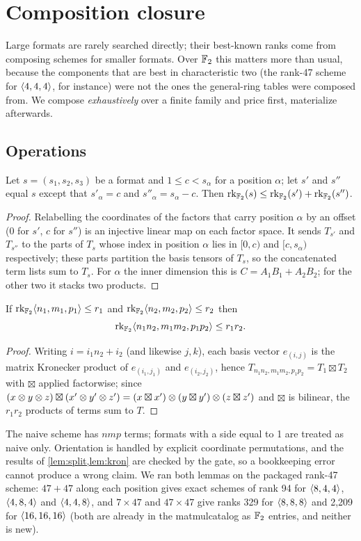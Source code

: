 \section{Composition closure}\label{sec:composition}

Large formats are rarely searched directly; their best-known ranks come from composing schemes for smaller formats. Over ${\mathbb{F}_2}$ this matters more than usual, because
the components that are best in characteristic two (the rank-47 scheme for $\langle 4,4,4\rangle$, for instance) were not the ones the general-ring tables were composed from.
We compose \emph{exhaustively} over a finite family and price first, materialize afterwards.

\subsection{Operations}
\begin{lemma}\label{lem:split}
Let $s=(s_1,s_2,s_3)$ be a format and $1\le c<s_\alpha$ for a position $\alpha$; let $s'$ and $s''$ equal $s$ except that $s'_\alpha=c$ and $s''_\alpha=s_\alpha-c$. Then $\operatorname{rk}_{\mathbb{F}_2}(s)\le\operatorname{rk}_{\mathbb{F}_2}(s')+\operatorname{rk}_{\mathbb{F}_2}(s'')$.
\end{lemma}
\begin{proof}
Relabelling the coordinates of the factors that carry position $\alpha$ by an offset ($0$ for $s'$, $c$ for $s''$) is an injective linear map on each factor space. It sends $T_{s'}$ and $T_{s''}$ to the parts of $T_s$ whose index in position $\alpha$ lies in $[0,c)$ and $[c,s_\alpha)$ respectively; these parts partition the basis tensors of $T_s$, so the concatenated term lists sum to $T_s$.
For $\alpha$ the inner dimension this is $C=A_1B_1+A_2B_2$; for the other two it stacks two products.
\end{proof}

\begin{lemma}\label{lem:kron}
If $\operatorname{rk}_{\mathbb{F}_2}\langle n_1,m_1,p_1\rangle\le r_1$ and $\operatorname{rk}_{\mathbb{F}_2}\langle n_2,m_2,p_2\rangle\le r_2$ then
\[ \operatorname{rk}_{\mathbb{F}_2}\langle n_1n_2,m_1m_2,p_1p_2\rangle\le r_1r_2. \]
\end{lemma}
\begin{proof}
Writing $i=i_1n_2+i_2$ (and likewise $j,k$), each basis vector $e_{(i,j)}$ is the matrix Kronecker product of $e_{(i_1,j_1)}$ and $e_{(i_2,j_2)}$, hence $T_{n_1n_2,m_1m_2,p_1p_2}=T_1\boxtimes T_2$ with $\boxtimes$ applied factorwise;
since $(x\otimes y\otimes z)\boxtimes(x'\otimes y'\otimes z')=(x\boxtimes x')\otimes(y\boxtimes y')\otimes(z\boxtimes z')$ and $\boxtimes$ is bilinear, the $r_1r_2$ products of terms sum to $T$.
\end{proof}
The naive scheme has $nmp$ terms; formats with a side equal to 1 are treated as naive only. Orientation is handled by explicit coordinate permutations, and the results of \cref{lem:split,lem:kron} are checked by the gate, so a bookkeeping error cannot produce a wrong claim.
We ran both lemmas on the packaged rank-47 scheme: $47+47$ along each position gives exact schemes of rank 94 for $\langle 8,4,4\rangle$, $\langle 4,8,4\rangle$ and $\langle 4,4,8\rangle$, and $7\times47$ and $47\times47$ give ranks 329 for $\langle 8,8,8\rangle$ and 2{,}209 for $\langle 16,16,16\rangle$
(both are already in the matmulcatalog as ${\mathbb{F}_2}$ entries, and neither is new).

